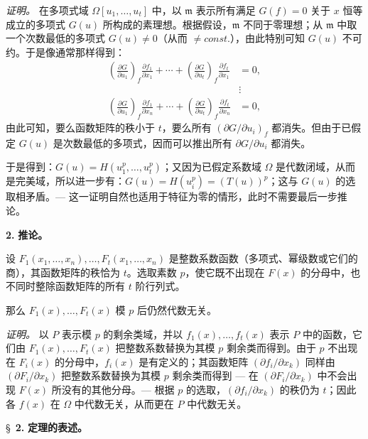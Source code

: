 \documentclass[11pt]{article}
\begin{document}
\noindent\textit{证明。}
在多项式域 $\Omega[u_1,\ldots,u_t]$ 中，以 $\mathfrak{m}$ 表示所有满足 $G(f) = 0$ 关于 $x$ 恒等成立的多项式 $G(u)$ 所构成的素理想。根据假设，$\mathfrak{m}$ 不同于零理想；从 $\mathfrak{m}$ 中取一个次数最低的多项式 $G(u) \neq 0$（从而 $\neq {const.}$），由此特别可知 $G(u)$ 不可约。于是像通常那样得到：
\[
\begin{aligned}
\left(\frac{\partial G}{\partial u_1}\right)_{f}\frac{\partial f_1}{\partial x_1}
 +\cdots+
\left(\frac{\partial G}{\partial u_t}\right)_{f}\frac{\partial f_t}{\partial x_1}&=0,\\[-1mm]
&\vdots\\[-1mm]
\left(\frac{\partial G}{\partial u_1}\right)_{f}\frac{\partial f_1}{\partial x_n}
 +\cdots+
\left(\frac{\partial G}{\partial u_t}\right)_{f}\frac{\partial f_t}{\partial x_n}&=0,
\end{aligned}
\]
由此可知，要么函数矩阵的秩小于 $t$，要么所有 $\left(\partial G/\partial u_i\right)_{f}$ 都消失。但由于已假定 $G(u)$ 是次数最低的多项式，因而可以推出所有 $\partial G/\partial u_i$ 都消失。

于是得到：$G(u)=H(u_1^p,\ldots,u_t^p)$；又因为已假定系数域 $\Omega$ 是代数闭域，从而是完美域，所以进一步有：$G(u)=H(u_i^p)=(T(u))^p$；这与 $G(u)$ 的选取相矛盾。--- 这一证明自然也适用于特征为零的情形，此时不需要最后一步推论。

\medskip\noindent\textbf{2.} \textbf{推论。}

设 $F_1(x_1,\ldots,x_n),\ldots,F_t(x_1,\ldots,x_n)$ 是整数系数函数（多项式、幂级数或它们的商），其函数矩阵的秩恰为 $t$。选取素数 $p$，使它既不出现在 $F(x)$ 的分母中，也不同时整除函数矩阵的所有 $t$ 阶行列式。

那么 $F_1(x),\ldots,F_t(x)$ 模 $p$ 后仍然代数无关。

\noindent\textit{证明。}
以 $P$ 表示模 $p$ 的剩余类域，并以 $f_1(x),\ldots,f_t(x)$ 表示 $P$ 中的函数，它们由 $F_1(x),\ldots,F_t(x)$ 把整数系数替换为其模 $p$ 剩余类而得到。由于 $p$ 不出现在 $F_i(x)$ 的分母中，$f_i(x)$ 是有定义的；其函数矩阵 $(\partial f_i/\partial x_k)$ 同样由 $(\partial F_i/\partial x_k)$ 把整数系数替换为其模 $p$ 剩余类而得到 --- 在 $(\partial F_i/\partial x_k)$ 中不会出现 $F(x)$ 所没有的其他分母。--- 根据 $p$ 的选取，$(\partial f_i/\partial x_k)$ 的秩仍为 $t$；因此各 $f(x)$ 在 $\Omega$ 中代数无关，从而更在 $P$ 中代数无关。

\bigskip
\S~\textbf{2.}
\textbf{定理的表述。}

\smallskip
\end{document}
